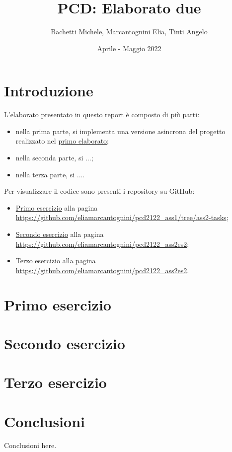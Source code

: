 \documentclass[12pt,a4paper,openright]{report}
\title{PCD: Elaborato due}
\author{Bachetti Michele, Marcantognini Elia, Tinti Angelo}
\date{Aprile - Maggio 2022}
\begin{document}

\maketitle

\tableofcontents

\chapter*{Introduzione}

L'elaborato presentato in questo report è composto di più parti:
\begin{itemize}
    \item nella prima parte, si implementa una versione asincrona del progetto realizzato nel \href{https://github.com/eliamarcantognini/pcd2122_ass1/blob/master/doc/report.pdf}{primo elaborato};
    \item nella seconda parte, si ...;
    \item nella terza parte, si ....
\end{itemize}

Per visualizzare il codice sono presenti i repository su GitHub:
\begin{itemize}
    \item \href{https://github.com/eliamarcantognini/pcd2122_ass1/tree/ass2-tasks}{Primo esercizio} alla pagina \url{https://github.com/eliamarcantognini/pcd2122_ass1/tree/ass2-tasks};
    \item \href{https://github.com/eliamarcantognini/pcd2122_ass2es2}{Secondo esercizio} alla pagina \url{https://github.com/eliamarcantognini/pcd2122_ass2es2};
    \item \href{https://github.com/eliamarcantognini/pcd2122_ass2es2}{Terzo esercizio} alla pagina \url{https://github.com/eliamarcantognini/pcd2122_ass2es2}.
\end{itemize}


\chapter{Primo esercizio} 
\label{chapter:es1}


\chapter{Secondo esercizio} 
\label{chapter:es2}


\chapter{Terzo esercizio} 
\label{chapter:es3}



\chapter*{Conclusioni}

Conclusioni here.
\end{document}
